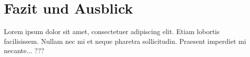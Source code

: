 \documentclass{article}
\begin{document}
	\section{Fazit und Ausblick}
	Lorem ipsum dolor sit amet, consectetuer adipiscing elit.  
	Etiam lobortis facilisissem.  Nullam nec mi et neque pharetra 
	sollicitudin.  Praesent imperdiet mi necante... ???
	
	
	
	\newpage	
	\printbibliography[title={\section{Referenzen}}]
	
\end{document}
